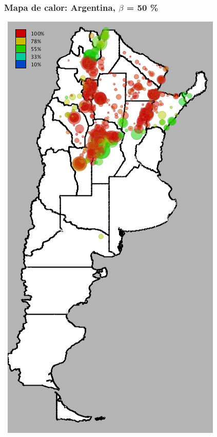 \documentclass{beamer}
\begin{document}
\begin{frame}
	\frametitle{Mapa de calor: Argentina, $\beta$ = 50 \%}
	\center\
	\includegraphics[height=.9\textheight,width = .9\columnwidth, keepaspectratio]
	{slides/201112_hi_res_argentina_usuarios_proporcion_circulos_beta50.png}
\end{frame}

\end{document}
